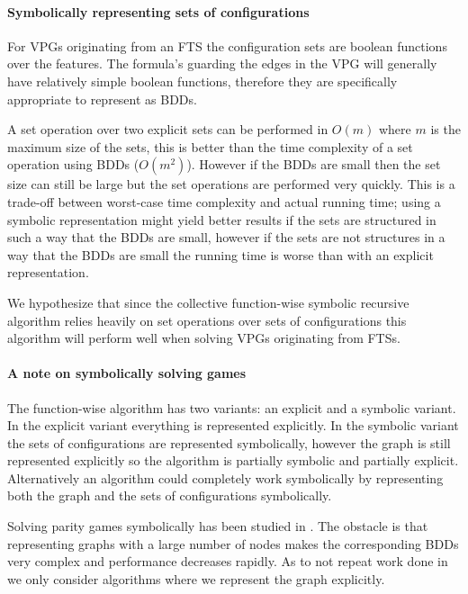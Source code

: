 \paragraph{Symbolically representing sets of configurations}
\label{sec:symrepconfs}
For VPGs originating from an FTS the configuration sets are boolean functions over the features. The formula's guarding the edges in the VPG will generally have relatively simple boolean functions, therefore they are specifically appropriate to represent as BDDs.

A set operation over two explicit sets can be performed in $O(m)$ where $m$ is the maximum size of the sets, this is better than the time complexity of a set operation using BDDs ($O(m^2)$). However if the BDDs are small then the set size can still be large but the set operations are performed very quickly. This is a trade-off between worst-case time complexity and actual running time; using a symbolic representation might yield better results if the sets are structured in such a way that the BDDs are small, however if the sets are not structures in a way that the BDDs are small the running time is worse than with an explicit representation.

We hypothesize that since the collective function-wise symbolic recursive algorithm relies heavily on set operations over sets of configurations this algorithm will perform well when solving VPGs originating from FTSs.

\paragraph{A note on symbolically solving games}
The function-wise algorithm has two variants: an explicit and a symbolic variant. In the explicit variant everything is represented explicitly. In the symbolic variant the sets of configurations are represented symbolically, however the graph is still represented explicitly so the algorithm is partially symbolic and partially explicit. Alternatively an algorithm could completely work symbolically by representing both the graph and the sets of configurations symbolically.

Solving parity games symbolically has been studied in \cite{BDDSolvingPG}. The obstacle is that representing graphs with a large number of nodes makes the corresponding BDDs very complex and performance decreases rapidly. As to not repeat work done in \cite{BDDSolvingPG} we only consider algorithms where we represent the graph explicitly. 

